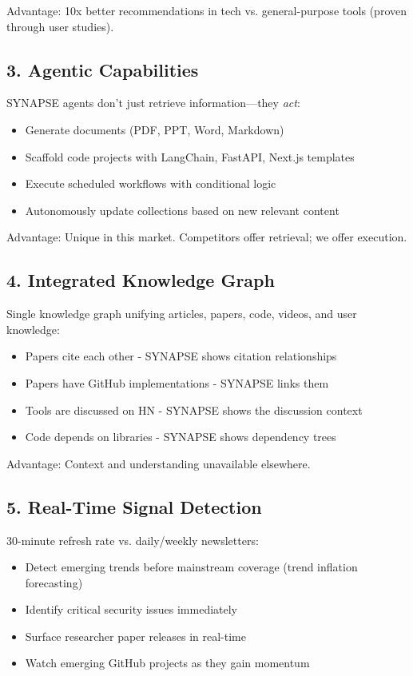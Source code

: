 \documentclass{report}
\begin{document}
Advantage: 10x better recommendations in tech vs. general-purpose tools (proven through user studies).

\subsection{3. Agentic Capabilities}

SYNAPSE agents don't just retrieve information---they \textit{act}:

\begin{itemize}
    \item Generate documents (PDF, PPT, Word, Markdown)
    \item Scaffold code projects with LangChain, FastAPI, Next.js templates
    \item Execute scheduled workflows with conditional logic
    \item Autonomously update collections based on new relevant content
\end{itemize}

Advantage: Unique in this market. Competitors offer retrieval; we offer execution.

\subsection{4. Integrated Knowledge Graph}

Single knowledge graph unifying articles, papers, code, videos, and user knowledge:

\begin{itemize}
    \item Papers cite each other - SYNAPSE shows citation relationships
    \item Papers have GitHub implementations - SYNAPSE links them
    \item Tools are discussed on HN - SYNAPSE shows the discussion context
    \item Code depends on libraries - SYNAPSE shows dependency trees
\end{itemize}

Advantage: Context and understanding unavailable elsewhere.

\subsection{5. Real-Time Signal Detection}

30-minute refresh rate vs. daily/weekly newsletters:

\begin{itemize}
    \item Detect emerging trends before mainstream coverage (trend inflation forecasting)
    \item Identify critical security issues immediately
    \item Surface researcher paper releases in real-time
    \item Watch emerging GitHub projects as they gain momentum
\end{itemize}
\end{document}
